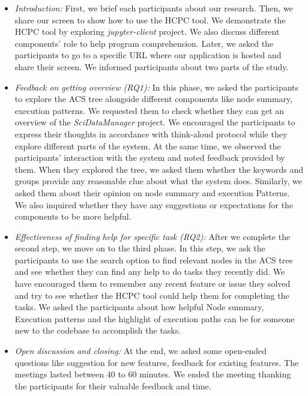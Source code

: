 \begin{itemize}
    \item \emph{Introduction:} First, we brief each participants about our research. Then, we share our screen to show how to use the HCPC tool. We demonstrate the HCPC tool by exploring \emph{jupyter-client} project. We also discuss different components' role to help program comprehension. Later, we asked the participants to go to a specific URL where our application is hosted and share their screen. We informed participants about two parts of the study.  
    
    \item \emph{Feedback on getting overview (RQ1):} In this phase, we asked the participants to explore the ACS tree alongside different components like node summary, execution patterns. We requested them to check whether they can get an  overview of the \emph{SciDataManager} project. We encouraged the participants to express their thoughts in accordance with think-aloud protocol \cite{jaaskelainen2010thinkAloudProtocol, zhou2018identifyingFeaturesForks} while they explore different parts of the system. At the same time, we observed the participants' interaction with the system and noted feedback provided by them. When they explored the tree, we asked them whether the keywords and groups provide any reasonable clue about what the system does. Similarly, we asked them about their opinion on node summary and execution Patterns. We also inquired whether they have any suggestions or expectations for the components to be more helpful.
    
    
    \item \emph{Effectiveness of finding help for specific task (RQ2):} After we complete the second step, we move on to the third phase. In this step, we ask the participants to use the search option to find relevant nodes in the ACS tree and see whether they can find any help to do tasks they recently did. We have encouraged them to remember any recent feature or issue they solved and try to see whether the HCPC tool could help them for completing the tasks. We asked the participants about how helpful Node summary, Execution patterns and the highlight of execution paths can be for someone new to the codebase to accomplish the tasks.
    \item \emph{Open discussion and closing:} At the end, we asked some open-ended questions like suggestion for new features, feedback for existing features. The meetings lasted between 40 to 60 minutes. We ended the meeting thanking the participants for their valuable feedback and time.

\end{itemize}
